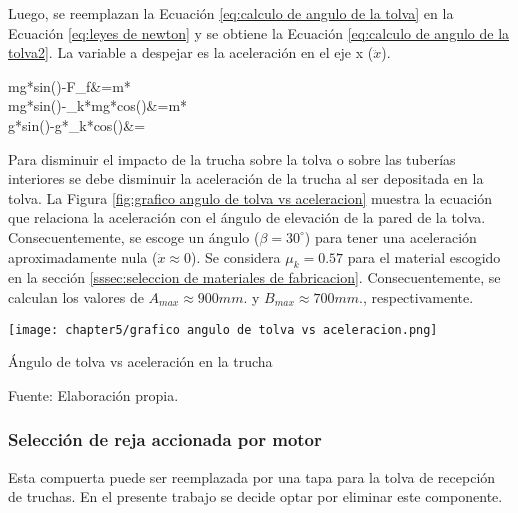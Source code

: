 Luego, se reemplazan la Ecuación \ref{eq:calculo de angulo de la tolva} en la Ecuación \ref{eq:leyes de newton} y se obtiene la Ecuación \ref{eq:calculo de angulo de la tolva2}. La variable a despejar es la aceleración en el eje x ($\ddot{x}$).

\begin{myequation}\label{eq:calculo de angulo de la tolva2}
	\begin{split}
		mg*sin(\beta)-F_{f}&=m* \\
		mg*sin(\beta)-\mu_{k}*mg*cos(\beta)&=m* \\
		g*sin(\beta)-g*\mu_{k}*cos(\beta)&=
	\end{split}
\end{myequation}

Para disminuir el impacto de la trucha sobre la tolva o sobre las tuberías interiores se debe disminuir la aceleración de la trucha al ser depositada en la tolva. La Figura \ref{fig:grafico angulo de tolva vs aceleracion} muestra la ecuación que relaciona la aceleración con el ángulo de elevación de la pared de la tolva. Consecuentemente, se escoge un ángulo ($\beta=30^\circ$) para tener una aceleración aproximadamente nula ($\ddot{x}\approx0$). Se considera $\mu_{k}=0.57$ para el material escogido en la sección \ref{sssec:seleccion de materiales de fabricacion}. Consecuentemente, se calculan los valores de $A_{max}\approx{900} mm.$ y $B_{max}\approx{700} mm.$, respectivamente.


\begin{myfigure}[H]
	\centering
	\texttt{[image: chapter5/grafico angulo de tolva vs aceleracion.png]}
	\caption{Ángulo de tolva vs aceleración en la trucha}
	\begin{myflushleftportland}
		Fuente: Elaboración propia.
	\end{myflushleftportland}
	\label{fig:grafico angulo de tolva vs aceleracion}
\end{myfigure}

\subsubsection{Selección de reja accionada por motor}

Esta compuerta puede ser reemplazada por una tapa para la tolva de recepción de truchas. En el presente trabajo se decide optar por eliminar este componente.

